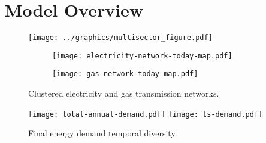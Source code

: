 \section{Model Overview}
\label{sec:si:model-overview}

\begin{figure}
    \centering
    \texttt{[image: ../graphics/multisector\_figure.pdf]}
\end{figure}

\begin{figure}
    \centering
\begin{subfigure}[t]{0.49\textwidth}
    \centering
    \texttt{[image: electricity-network-today-map.pdf]}
\end{subfigure}
\begin{subfigure}[t]{0.49\textwidth}
    \centering
    \texttt{[image: gas-network-today-map.pdf]}
\end{subfigure}
\caption{Clustered electricity and gas transmission networks.}
\label{fig:clustered-networks}
\end{figure}

\begin{figure}
    \centering
    \texttt{[image: total-annual-demand.pdf]}
    \texttt{[image: ts-demand.pdf]}
    \caption{Final energy demand temporal diversity.}
    \label{fig:demand-time}
\end{figure}

